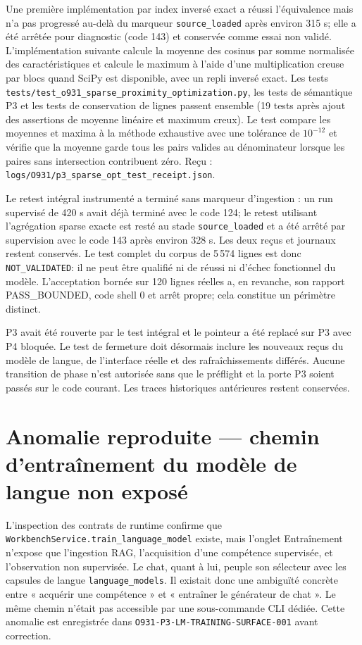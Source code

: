 \documentclass[11pt,a4paper]{article}
\begin{document}
Une première implémentation par index inversé exact a réussi l'équivalence mais n'a pas progressé au-delà du marqueur \texttt{source\_loaded} après environ 315 s; elle a été arrêtée pour diagnostic (code 143) et conservée comme essai non validé. L'implémentation suivante calcule la moyenne des cosinus par somme normalisée des caractéristiques et calcule le maximum à l'aide d'une multiplication creuse par blocs quand SciPy est disponible, avec un repli inversé exact. Les tests \texttt{tests/test\_o931\_sparse\_proximity\_optimization.py}, les tests de sémantique P3 et les tests de conservation de lignes passent ensemble (19 tests après ajout des assertions de moyenne linéaire et maximum creux). Le test compare les moyennes et maxima à la méthode exhaustive avec une tolérance de $10^{-12}$ et vérifie que la moyenne garde tous les pairs valides au dénominateur lorsque les paires sans intersection contribuent zéro. Reçu : \texttt{logs/O931/p3\_sparse\_opt\_test\_receipt.json}.

Le retest intégral instrumenté a terminé sans marqueur d'ingestion : un run supervisé de 420 s avait déjà terminé avec le code 124; le retest utilisant l'agrégation sparse exacte est resté au stade \texttt{source\_loaded} et a été arrêté par supervision avec le code 143 après environ 328 s. Les deux reçus et journaux restent conservés. Le test complet du corpus de 5\,574 lignes est donc \texttt{NOT\_VALIDATED}: il ne peut être qualifié ni de réussi ni d'échec fonctionnel du modèle. L'acceptation bornée sur 120 lignes réelles a, en revanche, son rapport PASS\_BOUNDED, code shell 0 et arrêt propre; cela constitue un périmètre distinct.

P3 avait été rouverte par le test intégral et le pointeur a été replacé sur P3 avec P4 bloquée. Le test de fermeture doit désormais inclure les nouveaux reçus du modèle de langue, de l'interface réelle et des rafraîchissements différés. Aucune transition de phase n'est autorisée sans que le préflight et la porte P3 soient passés sur le code courant. Les traces historiques antérieures restent conservées.


\section{Anomalie reproduite — chemin d'entraînement du modèle de langue non exposé}
L'inspection des contrats de runtime confirme que \texttt{WorkbenchService.train\_language\_model} existe, mais l'onglet Entraînement n'expose que l'ingestion RAG, l'acquisition d'une compétence supervisée, et l'observation non supervisée. Le chat, quant à lui, peuple son sélecteur avec les capsules de langue \texttt{language\_models}. Il existait donc une ambiguïté concrète entre « acquérir une compétence » et « entraîner le générateur de chat ». Le même chemin n'était pas accessible par une sous-commande CLI dédiée. Cette anomalie est enregistrée dans \texttt{O931-P3-LM-TRAINING-SURFACE-001} avant correction.
\end{document}
